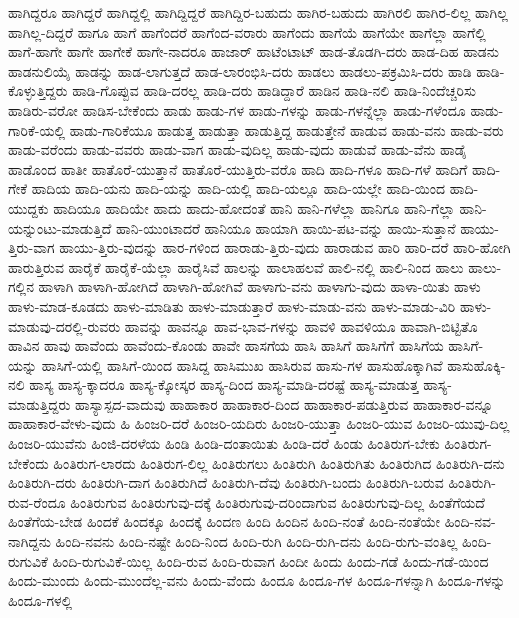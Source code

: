 {ಹಾಗಿದ್ದರೂ
ಹಾಗಿದ್ದರೆ
ಹಾಗಿದ್ದಲ್ಲಿ
ಹಾಗಿದ್ದಿದ್ದರೆ
ಹಾಗಿದ್ದಿರ-ಬಹುದು
ಹಾಗಿರ-ಬಹುದು
ಹಾಗಿರಲಿ
ಹಾಗಿರ-ಲಿಲ್ಲ
ಹಾಗಿಲ್ಲ
ಹಾಗಿಲ್ಲ-ದಿದ್ದರೆ
ಹಾಗೂ
ಹಾಗೆ
ಹಾಗೆಂದರೆ
ಹಾಗೆಂದ-ವರಾರು
ಹಾಗೆಂದು
ಹಾಗೆಯೆ
ಹಾಗೆಯೇ
ಹಾಗೆಲ್ಲಾ
ಹಾಗೆಲ್ಲಿ
ಹಾಗೆ-ಹಾಗೇ
ಹಾಗೇ
ಹಾಗೇಕೆ
ಹಾಗೇ-ನಾದರೂ
ಹಾಜಾರ್
ಹಾಟೆಂಟಾಟ್
ಹಾಡ-ತೊಡಗಿ-ದರು
ಹಾಡ-ದಿಹ
ಹಾಡನು
ಹಾಡನುಲಿಯೈ
ಹಾಡನ್ನು
ಹಾಡ-ಲಾಗುತ್ತದೆ
ಹಾಡ-ಲಾರಂಭಿಸಿ-ದರು
ಹಾಡಲು
ಹಾಡಲು-ಪಕ್ರಮಿಸಿ-ದರು
ಹಾಡಿ
ಹಾಡಿ-ಕೊಳ್ಳುತ್ತಿದ್ದರು
ಹಾಡಿ-ಗೊಪ್ಪುವ
ಹಾಡಿ-ದರಲ್ಲ
ಹಾಡಿ-ದರು
ಹಾಡಿದ್ದಾರೆ
ಹಾಡಿನ
ಹಾಡಿ-ನಲಿ
ಹಾಡಿ-ನಿಂದೆಚ್ಚರಿಸು
ಹಾಡಿರು-ವರೋ
ಹಾಡಿಸ-ಬೇಕೆಂದು
ಹಾಡು
ಹಾಡು-ಗಳ
ಹಾಡು-ಗಳನ್ನು
ಹಾಡು-ಗಳನ್ನೆಲ್ಲಾ
ಹಾಡು-ಗಳೆಂದೂ
ಹಾಡು-ಗಾರಿಕೆ-ಯಲ್ಲಿ
ಹಾಡು-ಗಾರಿಕೆಯೂ
ಹಾಡುತ್ತ
ಹಾಡುತ್ತಾ
ಹಾಡುತ್ತಿದ್ದ
ಹಾಡುತ್ತೇನೆ
ಹಾಡುವ
ಹಾಡು-ವನು
ಹಾಡು-ವರು
ಹಾಡು-ವರೆಂದು
ಹಾಡು-ವವರು
ಹಾಡು-ವಾಗ
ಹಾಡು-ವುದಿಲ್ಲ
ಹಾಡು-ವುದು
ಹಾಡುವೆ
ಹಾಡು-ವೆನು
ಹಾಡೈ
ಹಾಡೊಂದ
ಹಾತೀ
ಹಾತೊರೆ-ಯುತ್ತಾನೆ
ಹಾತೊರೆ-ಯುತ್ತಿರು-ವರೊ
ಹಾದಿ
ಹಾದಿ-ಗಳೂ
ಹಾದಿ-ಗಳೆ
ಹಾದಿಗೆ
ಹಾದಿ-ಗೇಕೆ
ಹಾದಿಯ
ಹಾದಿ-ಯನು
ಹಾದಿ-ಯನ್ನು
ಹಾದಿ-ಯಲ್ಲಿ
ಹಾದಿ-ಯಲ್ಲೂ
ಹಾದಿ-ಯಲ್ಲೇ
ಹಾದಿ-ಯಿಂದ
ಹಾದಿ-ಯುದ್ದಕು
ಹಾದಿಯೂ
ಹಾದಿಯೇ
ಹಾದು
ಹಾದು-ಹೋದಂತೆ
ಹಾನಿ
ಹಾನಿ-ಗಳೆಲ್ಲಾ
ಹಾನಿಗೂ
ಹಾನಿ-ಗೆಲ್ಲಾ
ಹಾನಿ-ಯನ್ನುಂಟು-ಮಾಡುತ್ತಿದೆ
ಹಾನಿ-ಯುಂಟಾದರೆ
ಹಾನಿಯೂ
ಹಾಯಾಗಿ
ಹಾಯಿ-ಪಟ-ವನ್ನು
ಹಾಯಿ-ಸುತ್ತಾನೆ
ಹಾಯು-ತ್ತಿರು-ವಾಗ
ಹಾಯು-ತ್ತಿರು-ವುದನ್ನು
ಹಾರ-ಗಳಿಂದ
ಹಾರಾಡು-ತ್ತಿರು-ವುದು
ಹಾರಾಡುವ
ಹಾರಿ
ಹಾರಿ-ದರೆ
ಹಾರಿ-ಹೋಗಿ
ಹಾರುತ್ತಿರುವ
ಹಾರೈಕೆ
ಹಾರೈಕೆ-ಯೆಲ್ಲಾ
ಹಾರೈಸಿವೆ
ಹಾಲನ್ನು
ಹಾಲಾಹಲವೆ
ಹಾಲಿ-ನಲ್ಲಿ
ಹಾಲಿ-ನಿಂದ
ಹಾಲು
ಹಾಲು-ಗಲ್ಲಿನ
ಹಾಳಾಗಿ
ಹಾಳಾಗಿ-ಹೋಗಿದೆ
ಹಾಳಾಗಿ-ಹೋಗಿವೆ
ಹಾಳಾಗು-ವನು
ಹಾಳಾಗು-ವುದು
ಹಾಳಾ-ಯಿತು
ಹಾಳು
ಹಾಳು-ಮಾಡ-ಕೂಡದು
ಹಾಳು-ಮಾಡಿತು
ಹಾಳು-ಮಾಡುತ್ತಾರೆ
ಹಾಳು-ಮಾಡು-ವನು
ಹಾಳು-ಮಾಡು-ವಿರಿ
ಹಾಳು-ಮಾಡುವು-ದರಲ್ಲಿ-ರುವರು
ಹಾವನ್ನು
ಹಾವನ್ನೂ
ಹಾವ-ಭಾವ-ಗಳನ್ನು
ಹಾವಳಿ
ಹಾವಳಿಯೂ
ಹಾವಾಗಿ-ಬಿಟ್ಟಿತೊ
ಹಾವಿನ
ಹಾವು
ಹಾವೆಂದು
ಹಾವೆಂದು-ಕೊಂಡು
ಹಾವೇ
ಹಾಸಗೆಯ
ಹಾಸಿ
ಹಾಸಿಗೆ
ಹಾಸಿಗೆಗೆ
ಹಾಸಿಗೆಯ
ಹಾಸಿಗೆ-ಯನ್ನು
ಹಾಸಿಗೆ-ಯಲ್ಲಿ
ಹಾಸಿಗೆ-ಯಿಂದ
ಹಾಸಿದ್ದ
ಹಾಸಿಮುಖ
ಹಾಸಿರುವ
ಹಾಸು-ಗಳ
ಹಾಸುಹೊಕ್ಕಾಗಿವೆ
ಹಾಸುಹೊಕ್ಕಿ-ನಲಿ
ಹಾಸ್ಯ
ಹಾಸ್ಯ-ಕ್ಕಾದರೂ
ಹಾಸ್ಯ-ಕ್ಕೋಸ್ಕರ
ಹಾಸ್ಯ-ದಿಂದ
ಹಾಸ್ಯ-ಮಾಡಿ-ದರಷ್ಟೆ
ಹಾಸ್ಯ-ಮಾಡುತ್ತ
ಹಾಸ್ಯ-ಮಾಡುತ್ತಿದ್ದರು
ಹಾಸ್ಯಾಸ್ಪದ-ವಾದುವು
ಹಾಹಾಕಾರ
ಹಾಹಾಕಾರ-ದಿಂದ
ಹಾಹಾಕಾರ-ಪಡುತ್ತಿರುವ
ಹಾಹಾಕಾರ-ವನ್ನೂ
ಹಾಹಾಕಾರ-ವೇಳು-ವುದು
ಹಿ
ಹಿಂಜರಿ-ದರೆ
ಹಿಂಜರಿ-ಯದಿರು
ಹಿಂಜರಿ-ಯುತ್ತಾ
ಹಿಂಜರಿ-ಯುವ
ಹಿಂಜರಿ-ಯುವು-ದಿಲ್ಲ
ಹಿಂಜರಿ-ಯುವೆನು
ಹಿಂಜಿ-ದರಳೆಯ
ಹಿಂಡಿ
ಹಿಂಡಿ-ದಂತಾಯಿತು
ಹಿಂಡಿ-ದರೆ
ಹಿಂಡು
ಹಿಂತಿರುಗ-ಬೇಕು
ಹಿಂತಿರುಗ-ಬೇಕೆಂದು
ಹಿಂತಿರುಗ-ಲಾರದು
ಹಿಂತಿರುಗ-ಲಿಲ್ಲ
ಹಿಂತಿರುಗಲು
ಹಿಂತಿರುಗಿ
ಹಿಂತಿರುಗಿತು
ಹಿಂತಿರುಗಿದ
ಹಿಂತಿರುಗಿ-ದನು
ಹಿಂತಿರುಗಿ-ದರು
ಹಿಂತಿರುಗಿ-ದಾಗ
ಹಿಂತಿರುಗಿದೆ
ಹಿಂತಿರುಗಿ-ದೆವು
ಹಿಂತಿರುಗಿ-ಬಂದು
ಹಿಂತಿರುಗಿ-ಬರುವ
ಹಿಂತಿರುಗಿ-ರುವ-ರೆಂದೂ
ಹಿಂತಿರುಗುವ
ಹಿಂತಿರುಗುವು-ದಕ್ಕೆ
ಹಿಂತಿರುಗುವು-ದರಿಂದಾಗುವ
ಹಿಂತಿರುಗುವು-ದಿಲ್ಲ
ಹಿಂತೆಗೆಯದೆ
ಹಿಂತೆಗೆಯ-ಬೇಡ
ಹಿಂದಕೆ
ಹಿಂದಕ್ಕೂ
ಹಿಂದಕ್ಕೆ
ಹಿಂದಣ
ಹಿಂದಿ
ಹಿಂದಿನ
ಹಿಂದಿ-ನಂತೆ
ಹಿಂದಿ-ನಂತೆಯೇ
ಹಿಂದಿ-ನವ-ನಾಗಿದ್ದನು
ಹಿಂದಿ-ನವನು
ಹಿಂದಿ-ನಷ್ಟೇ
ಹಿಂದಿ-ನಿಂದ
ಹಿಂದಿ-ರುಗಿ
ಹಿಂದಿ-ರುಗಿ-ದನು
ಹಿಂದಿ-ರುಗು-ವಂತಿಲ್ಲ
ಹಿಂದಿ-ರುಗುವಿಕೆ
ಹಿಂದಿ-ರುಗುವಿಕೆ-ಯಿಲ್ಲ
ಹಿಂದಿ-ರುವ
ಹಿಂದಿ-ರುವಾಗ
ಹಿಂದೀ
ಹಿಂದು
ಹಿಂದು-ಗಡೆ
ಹಿಂದು-ಗಡೆ-ಯಿಂದ
ಹಿಂದು-ಮುಂದು
ಹಿಂದು-ಮುಂದೆಲ್ಲ-ವನು
ಹಿಂದು-ವೆಂದು
ಹಿಂದೂ
ಹಿಂದೂ-ಗಳ
ಹಿಂದೂ-ಗಳನ್ನಾಗಿ
ಹಿಂದೂ-ಗಳನ್ನು
ಹಿಂದೂ-ಗಳಲ್ಲಿ
}
